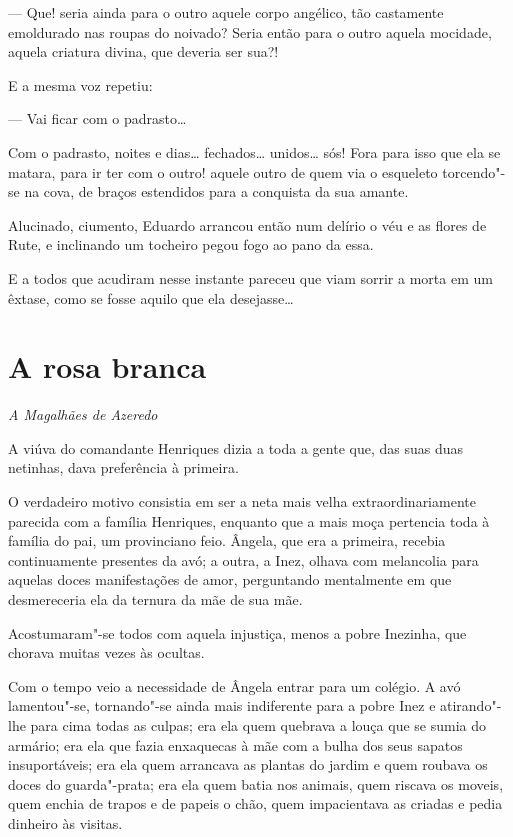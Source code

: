 --- Que! seria ainda para o outro aquele corpo angélico, tão castamente
emoldurado nas roupas do noivado? Seria então para o outro aquela
mocidade, aquela criatura divina, que deveria ser sua?!

E a mesma voz repetiu:

--- Vai ficar com o padrasto\ldots{}

Com o padrasto, noites e dias\ldots{} fechados\ldots{} unidos\ldots{} sós! Fora para
isso que ela se matara, para ir ter com o outro! aquele outro de quem
via o esqueleto torcendo"-se na cova, de braços estendidos para a
conquista da sua amante.

Alucinado, ciumento, Eduardo arrancou então num delírio o véu e as
flores de Rute, e inclinando um tocheiro pegou fogo ao pano da essa.

E a todos que acudiram nesse instante pareceu que viam sorrir a morta em
um êxtase, como se fosse aquilo que ela desejasse\ldots{}

\chapter{A rosa branca}

\hfill{}\emph{A Magalhães de Azeredo}

\bigskip

A viúva do comandante Henriques dizia a toda a gente que, das suas duas
netinhas, dava preferência à primeira.

O verdadeiro motivo consistia em ser a neta mais velha
extraordinariamente parecida com a família Henriques, enquanto que a
mais moça pertencia toda à família do pai, um provinciano feio. Ângela,
que era a primeira, recebia continuamente presentes da avó; a outra, a
Inez, olhava com melancolia para aquelas doces manifestações de amor,
perguntando mentalmente em que desmereceria ela da ternura da mãe de sua
mãe.

Acostumaram"-se todos com aquela injustiça, menos a pobre Inezinha, que
chorava muitas vezes às ocultas.

Com o tempo veio a necessidade de Ângela entrar para um colégio. A avó
lamentou"-se, tornando"-se ainda mais indiferente para a pobre Inez e
atirando"-lhe para cima todas as culpas; era ela quem quebrava a louça
que se sumia do armário; era ela que fazia enxaquecas à mãe com a bulha
dos seus sapatos insuportáveis; era ela quem arrancava as plantas do
jardim e quem roubava os doces do guarda"-prata; era ela quem batia nos
animais, quem riscava os moveis, quem enchia de trapos e de papeis o
chão, quem impacientava as criadas e pedia dinheiro às visitas.

